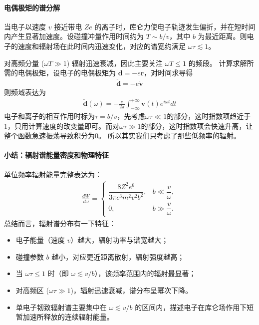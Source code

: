 \paragraph{电偶极矩的谱分解}
当电子以速度 $v$ 接近带电 $Ze$ 的离子时，库仑力使电子轨迹发生偏折，并在短时间内产生显著加速度。设碰撞冲量作用时间约为 $T \sim b/v$，其中 $b$ 为最近距离。则电子的速度和辐射场在此时间内迅速变化，对应的谱宽约满足 $\omega \tau \lesssim 1$。

对高频分量 ($\omega T \gg 1$) 辐射迅速衰减，因此主要关注 $\omega T \le 1$ 的频段。
计算求解所需的电偶极矩，设电子的电偶极矩为 $\boldsymbol d = -e\boldsymbol r$，对时间求导得
\begin{align}
  \ddot{\boldsymbol d} = -e\boldsymbol \dot{v}
\end{align}
则频域表达为
\begin{align}
  \ddot{\boldsymbol d}(\omega)
  = -\frac{e}{2\pi} \int_{-\infty}^{+\infty} \boldsymbol \dot{v}(t)e^{i\omega t}dt
\end{align}
电子和离子的相互作用时标为$\tau = b/v$，先考虑$\omega \tau \ll 1$的部分，这时指数项趋近于1，只用计算速度的改变量即可。而对$\omega \tau \gg 1$的部分，这时指数项会快速升高，让整个函数急速振荡导致积分为0。
所以其实我们只考虑了那些低频率的辐射。
\paragraph{小结：辐射谱能量密度和物理特征}
单位频率辐射能量完整表达为：
\begin{align}
  \frac{dW}{d\omega}
  = \begin{cases}
    \dfrac{8Z^2 e^6}{3\pi c^3 m^2 v^2 b^2}, & b \ll \dfrac{v}{\omega},\\[1em]
    0, & b \gg \dfrac{v}{\omega}.
  \end{cases}
  \label{eq:single_brem_spectrum_b}
\end{align}
总结而言，辐射谱分布有一下特征：
\begin{itemize}
  \item 电子能量（速度 $v$）越大，辐射功率与谱宽越大；
  \item 碰撞参数 $b$ 越小，对应更近距离散射，辐射强度越高；
  \item 当 $\omega \tau \le 1$ 时（即 $\omega \lesssim v/b$），该频率范围内的辐射最显著；
  \item 对高频区 ($\omega \tau \gg 1$)，辐射迅速衰减，谱分布呈幂次下降。
  \item 单电子韧致辐射谱主要集中在 $\omega \lesssim v/b$ 的区间内，描述电子在库仑场作用下短暂加速所释放的连续辐射能量。
\end{itemize}

